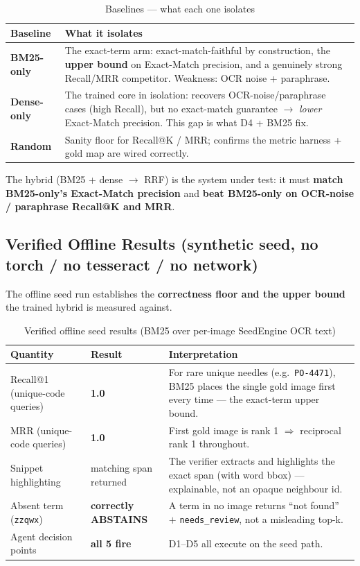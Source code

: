 \documentclass[12pt,a4paper]{article}
\begin{document}
\begin{table}[H]
\centering
\caption{Baselines --- what each one isolates}
\small
\begin{tabularx}{\linewidth}{@{} l L @{}}
\toprule
\textbf{Baseline} & \textbf{What it isolates} \\
\midrule
\textbf{BM25-only} & The exact-term arm: exact-match-faithful by construction, the \textbf{upper bound} on Exact-Match precision, and a genuinely strong Recall/MRR competitor. Weakness: OCR noise + paraphrase. \\
\textbf{Dense-only} & The trained core in isolation: recovers OCR-noise/paraphrase cases (high Recall), but no exact-match guarantee $\rightarrow$ \emph{lower} Exact-Match precision. This gap is what D4 + BM25 fix. \\
\textbf{Random} & Sanity floor for Recall@K / MRR; confirms the metric harness + gold map are wired correctly. \\
\bottomrule
\end{tabularx}
\end{table}

\noindent The hybrid (BM25 + dense $\rightarrow$ RRF) is the system under test: it must \textbf{match BM25-only's Exact-Match precision} and \textbf{beat BM25-only on OCR-noise / paraphrase Recall@K and MRR}.

\subsection{Verified Offline Results (synthetic seed, no torch / no tesseract / no network)}

The offline seed run establishes the \textbf{correctness floor and the upper bound} the trained hybrid is measured against.

\begin{table}[H]
\centering
\caption{Verified offline seed results (BM25 over per-image SeedEngine OCR text)}
\begin{tabularx}{\linewidth}{@{} l l L @{}}
\toprule
\textbf{Quantity} & \textbf{Result} & \textbf{Interpretation} \\
\midrule
Recall@1 (unique-code queries) & \textbf{1.0} & For rare unique needles (e.g.\ \texttt{PO-4471}), BM25 places the single gold image first every time --- the exact-term upper bound. \\
MRR (unique-code queries) & \textbf{1.0} & First gold image is rank 1 $\Rightarrow$ reciprocal rank 1 throughout. \\
Snippet highlighting & matching span returned & The verifier extracts and highlights the exact span (with word bbox) --- explainable, not an opaque neighbour id. \\
Absent term (\texttt{zzqwx}) & \textbf{correctly ABSTAINS} & A term in no image returns ``not found'' $+$ \texttt{needs\_review}, not a misleading top-k. \\
Agent decision points & \textbf{all 5 fire} & D1--D5 all execute on the seed path. \\
\bottomrule
\end{tabularx}
\end{table}
\end{document}
